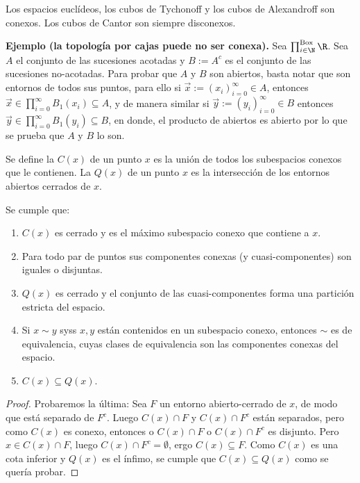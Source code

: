 \documentclass[topologia-analisis.tex]{subfiles}
\begin{document}
\begin{cor}
	Los espacios euclídeos, los cubos de Tychonoff y los cubos de Alexandroff son conexos.
	Los cubos de Cantor son siempre disconexos.
\end{cor}

\textbf{Ejemplo (la topología por cajas puede no ser conexa).}
Sea $\prod_{i\in\N}^{\rm Box} \R$.
Sea $A$ el conjunto de las sucesiones acotadas y $B := A^c$ es el conjunto de las sucesiones no-acotadas.
Para probar que $A$ y $B$ son abiertos, basta notar que son entornos de todos sus puntos, para ello si $\vec x := (x_i)_{i=0}^\infty \in A$, entonces $\vec x\in \prod_{i=0}^\infty B_1(x_i) \subseteq A$, y de manera similar si $\vec y := (y_i)_{i=0}^\infty \in B$ entonces $\vec y \in \prod_{i=0}^\infty B_1(y_i) \subseteq B$, en donde, el producto de abiertos es abierto por lo que se prueba que $A$ y $B$ lo son.

\begin{mydefi}
	Se define la  $C(x)$ de un punto $x$ es la unión de todos los subespacios conexos que le contienen.
	La  $Q(x)$ de un punto $x$ es la intersección de los entornos abiertos cerrados de $x$.
\end{mydefi}
\begin{prop}
	Se cumple que:
	\begin{enumerate}
		\item $C(x)$ es cerrado y es el máximo subespacio conexo que contiene a $x$.
		\item Para todo par de puntos sus componentes conexas (y cuasi-componentes) son iguales o disjuntas.
		\item $Q(x)$ es cerrado y el conjunto de las cuasi-componentes forma una partición estricta del espacio.
		\item Si $x\sim y$ syss $x,y$ están contenidos en un subespacio conexo, entonces $\sim$ es de equivalencia,
			cuyas clases de equivalencia son las componentes conexas del espacio.
		\item $C(x) \subseteq Q(x)$.
	\end{enumerate}
\end{prop}
\begin{proof}
	Probaremos la última: Sea $F$ un entorno abierto-cerrado de $x$, de modo que está separado de $F^c$.
	Luego $C(x)\cap F$ y $C(x)\cap F^c$ están separados, pero como $C(x)$ es conexo, entonces o $C(x)\cap F$ o $C(x)\cap F^c$ es disjunto.
	Pero $x \in C(x)\cap F$, luego $C(x)\cap F^c = \emptyset$, ergo $C(x) \subseteq F$. Como $C(x)$ es una cota inferior y $Q(x)$ es el ínfimo,
	se cumple que $C(x) \subseteq Q(x)$ como se quería probar.
\end{proof}
\end{document}
